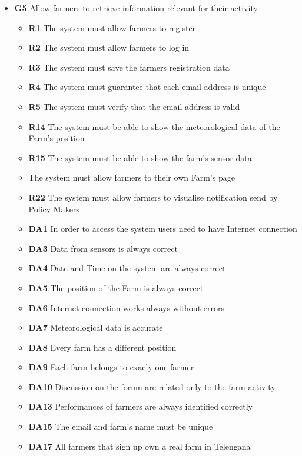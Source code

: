 \begin{itemize}
\item \textbf{G5} Allow farmers to retrieve information relevant for their activity
    \begin{itemize}
    \renewcommand\labelitemi{--}
    \item \textbf{R1} The system must allow farmers to register
    \item \textbf{R2} The system must allow farmers to log in
    \item \textbf{R3} The system must save the farmers registration data
    \item \textbf{R4} The system must guarantee that each email address is unique
    \item \textbf{R5} The system must verify that the email address is valid
    \item \textbf{R14} The system must be able to show the meteorological data of the Farm’s position
    \item \textbf{R15} The system must be able to show the farm’s sensor data
    \item \textbf{} The system must allow farmers to their own Farm's page
    \item \textbf{R22} The system must allow farmers to visualise notification send by Policy Makers
    \item \textbf{DA1} In order to access the system users need to have Internet connection
    \item \textbf{DA3} Data from sensors is always correct
    \item \textbf{DA4} Date and Time on the system are always correct
    \item \textbf{DA5} The position of the Farm is always correct
    \item \textbf{DA6} Internet connection works always without errors
    \item \textbf{DA7} Meteorological data is accurate
    \item \textbf{DA8} Every farm has a different position
    \item \textbf{DA9} Each farm belongs to exacly one farmer
    \item \textbf{DA10} Discussion on the forum are related only to the farm activity
    \item \textbf{DA13} Performances of farmers are always identified correctly
    \item \textbf{DA15} The email and farm's name must be unique
    \item \textbf{DA17} All farmers that sign up own a real farm in Telengana
    \end{itemize} 
    

\end{itemize}
